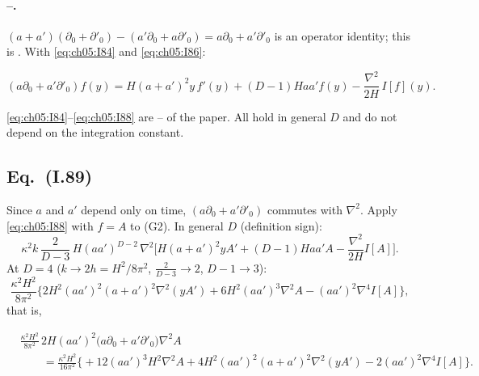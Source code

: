 \paragraph{--.}
$(a+a')(\partial_0+\partial'_0)-(a'\partial_0+a\partial'_0)=a\partial_0+a'\partial'_0$ is an operator identity; this is . With \eqref{eq:ch05:I84} and \eqref{eq:ch05:I86}:
\begin{resultbox}
\begin{equation}
(a\partial_0+a'\partial'_0)f(y)=H(a+a')^2y\,f'(y)+(D-1)Haa'f(y)-\frac{\nabla^2}{2H}\,I[f](y).
\tag{I.88}\label{eq:ch05:I88}
\end{equation}
\end{resultbox}
\noindent \eqref{eq:ch05:I84}--\eqref{eq:ch05:I88} are -- of the paper. All hold in general $D$ and do not depend on the integration constant.

\subsection[Eq. (I.89)]{Eq.~(I.89) \tD}
\label{sec:ch05:t12:89}

Since $a$ and $a'$ depend only on time, $(a\partial_0+a'\partial'_0)$ commutes with $\nabla^2$.
Apply \eqref{eq:ch05:I88} with $f=A$ to (G2). In general $D$ (definition sign):
\begin{equation}
\kappa^2k\,\frac{2}{D-3}\,H(aa')^{D-2}\,\nabla^2\Big[H(a+a')^2yA'+(D-1)Haa'A-\frac{\nabla^2}{2H}I[A]\Big].
\label{eq:ch05:t12:89D}
\end{equation}
At $D=4$ ($k\to2h=H^2/8\pi^2$, $\frac2{D-3}\to2$, $D-1\to3$):
\begin{equation*}
\frac{\kappa^2H^2}{8\pi^2}\Big\{2H^2(aa')^2(a+a')^2\nabla^2(yA')+6H^2(aa')^3\nabla^2A-(aa')^2\nabla^4I[A]\Big\},
\end{equation*}
that is,
\begin{resultbox}
\begin{equation}
\begin{aligned}
&\frac{\kappa^2H^2}{8\pi^2}\,2H(aa')^2\big(a\partial_0+a'\partial'_0\big)\nabla^2A\\
&\qquad=\frac{\kappa^2H^2}{16\pi^2}\Big\{+12(aa')^3H^2\nabla^2A+4H^2(aa')^2(a+a')^2\nabla^2(yA')-2(aa')^2\nabla^4I[A]\Big\}.
\end{aligned}
\tag{I.89$'$}\label{eq:ch05:I89}
\end{equation}
\end{resultbox}

